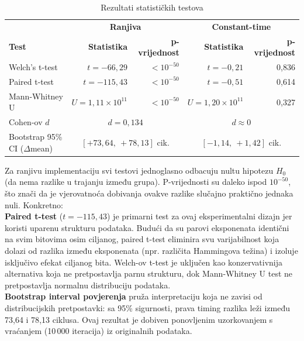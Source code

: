 \begin{table}[H]
\centering
\caption{Rezultati statističkih testova}
\label{tab:stat_tests}
\small
\begin{tabular}{lrr|rr}
\toprule
 & \multicolumn{2}{c|}{\textbf{Ranjiva}} & \multicolumn{2}{c}{\textbf{Constant-time}} \\
\textbf{Test} & \textbf{Statistika} & \textbf{p-vrijednost} & \textbf{Statistika} & \textbf{p-vrijednost} \\
\midrule
Welch's t-test   & $t = -66{,}29$ & $< 10^{-50}$   & $t = -0{,}21$ & 0{,}836 \\
Paired t-test    & $t = -115{,}43$ & $< 10^{-50}$  & $t = -0{,}51$ & 0{,}614 \\
Mann-Whitney U   & $U = 1{,}11 \times 10^{11}$ & $< 10^{-50}$ & $U = 1{,}20 \times 10^{11}$ & 0{,}327 \\
Cohen-ov $d$      & \multicolumn{2}{c|}{$d = 0{,}134$}  & \multicolumn{2}{c}{$d \approx 0$} \\
Bootstrap 95\% CI ($\Delta$mean) & \multicolumn{2}{c|}{$[+73{,}64,\ +78{,}13]$ cik.} & \multicolumn{2}{c}{$[-1{,}14,\ +1{,}42]$ cik.} \\
\bottomrule
\end{tabular}
\end{table}

Za ranjivu implementaciju svi testovi jednoglasno odbacuju nultu hipotezu $H_0$ (da nema razlike u trajanju između grupa). P-vrijednosti su daleko ispod $10^{-50}$, što znači da je vjerovatnoća dobivanja ovakve razlike slučajno praktično jednaka nuli. Konkretno:
\\

\textbf{Paired t-test} ($t = -115{,}43$) je primarni test za ovaj eksperimentalni dizajn jer koristi uparenu strukturu podataka. Budući da su parovi eksponenata identični na svim bitovima osim ciljanog, paired t-test eliminira svu varijabilnost koja dolazi od razlika između eksponenata (npr. različita Hammingova težina) i izoluje isključivo efekat ciljanog bita. Welch-ov t-test je uključen kao konzervativnija alternativa koja ne pretpostavlja parnu strukturu, dok Mann-Whitney U test ne pretpostavlja normalnu distribuciju podataka.
\\

\textbf{Bootstrap interval povjerenja} pruža interpretaciju koja ne zavisi od distribucijskih pretpostavki: sa 95\% sigurnosti, prava timing razlika leži između 73{,}64 i 78{,}13 ciklusa. Ovaj rezultat je dobiven ponovljenim uzorkovanjem s vraćanjem (10\,000 iteracija) iz originalnih podataka.
\\

